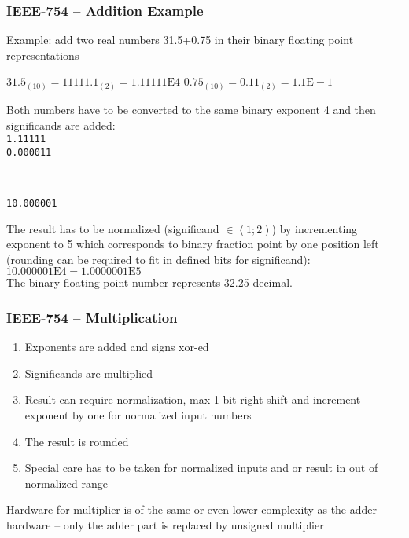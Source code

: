 \documentclass{beamer}
\begin{document}
\begin{frame}
\frametitle{IEEE-754 -- Addition Example}

Example: add two real numbers 31.5+0.75 in their binary floating point representations

$31.5_{(10)} = 11111.1_{(2)} = 1.11111\text{E}4$ \phantom{xxx} $0.75_{(10)} = 0.11_{(2)} = 1.1\text{E}-1$

\bigskip
Both numbers have to be converted to the same binary exponent 4 and then significands are added:\\
\texttt{\phantom{xx}1.11111}\\
\texttt{\phantom{xx}0.000011}\vspace{-6pt}\\
\rule[0pt]{2cm}{0.4pt}\\
\texttt{\phantom{x}10.000001}
\bigskip

The result has to be normalized (significand $\in \left\langle 1; 2 \right)$) by incrementing exponent to 5 which corresponds to binary fraction point by one position left (rounding can be required to fit in defined bits for significand):\\
$10.000001\text{E}4 = 1.0000001\text{E}5$\\

The binary floating point number represents 32.25 decimal.

\end{frame}

\begin{frame}
\frametitle{IEEE-754 -- Multiplication}

\begin{enumerate}
\item Exponents are added and signs xor-ed
\item Significands are multiplied
\item Result can require normalization, max 1 bit right shift and increment exponent by one for normalized input numbers
\item The result is rounded
\item Special care has to be taken for normalized inputs and or result in out of normalized range
\end{enumerate}

Hardware for multiplier is of the same or even lower complexity as the adder hardware -- only the adder part is replaced by unsigned multiplier

\end{frame}
\end{document}
